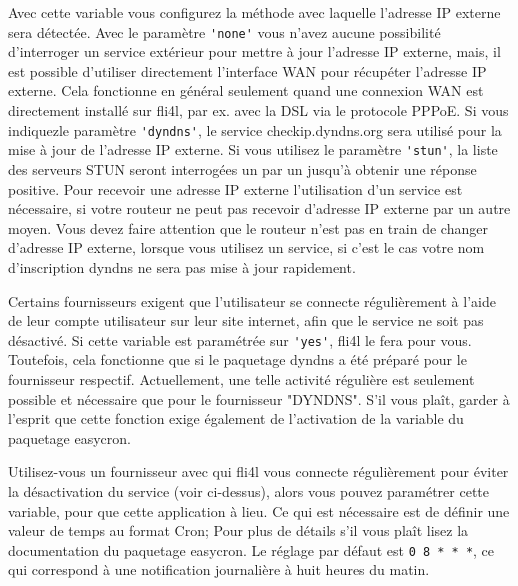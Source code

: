 \begin{description}
	Avec cette variable vous configurez la méthode avec laquelle l'adresse IP
	externe sera détectée. Avec le paramètre \verb*?'none'? vous n'avez aucune
	possibilité d'interroger un service extérieur pour mettre à jour l'adresse
	IP externe, mais, il est possible d'utiliser directement l'interface WAN pour
	récupéter l'adresse IP externe. Cela fonctionne en général seulement quand une
	connexion WAN est directement installé sur fli4l, par ex. avec la DSL via le
	protocole PPPoE. Si vous indiquezle paramètre \verb*?'dyndns'?, le service
	checkip.dyndns.org sera utilisé pour la mise à jour de l'adresse IP externe. Si
	vous utilisez le paramètre \verb*?'stun'?, la liste des serveurs STUN seront
	interrogées un par un jusqu'à obtenir une réponse positive. Pour recevoir une
	adresse IP externe l'utilisation d'un service est nécessaire, si votre routeur
	ne peut pas recevoir d'adresse IP externe par un autre moyen. Vous devez faire
	attention que le routeur n'est pas en train de changer d'adresse IP externe,
	lorsque vous utilisez un service, si c'est le cas votre nom d'inscription dyndns
	ne sera pas mise à jour rapidement.


    Certains fournisseurs exigent que l'utilisateur se connecte régulièrement
    à l'aide de leur compte utilisateur sur leur site internet, afin que le
    service ne soit pas désactivé. Si cette variable est paramétrée sur \verb*?'yes'?,
    fli4l le fera pour vous. Toutefois, cela fonctionne que si le paquetage
    dyndns a été préparé pour le fournisseur respectif. Actuellement, une telle
    activité régulière est seulement possible et nécessaire que pour le
    fournisseur "DYNDNS". S'il vous plaît, garder à l'esprit que cette fonction
    exige également de l'activation de la variable 
    du paquetage easycron.


    Utilisez-vous un fournisseur avec qui fli4l vous connecte régulièrement pour
    éviter la désactivation du service (voir ci-dessus), alors vous pouvez
    paramétrer cette variable, pour que cette application à lieu. Ce qui est
    nécessaire est de définir une valeur de temps au format Cron; Pour plus de
    détails s'il vous plaît lisez la documentation du paquetage easycron. Le
    réglage par défaut est \texttt{0 8 * * *}, ce qui correspond à une notification
    journalière à huit heures du matin.


\end{description}
